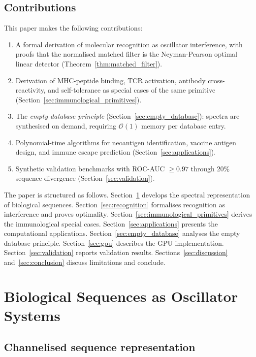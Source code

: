 \documentclass[twocolumn,11pt,a4paper]{article}
\theoremstyle{definition}
\theoremstyle{remark}
\begin{document}
\subsection{Contributions}

This paper makes the following contributions:
\begin{enumerate}
  \item A formal derivation of molecular recognition as oscillator interference,
    with proofs that the normalised matched filter is the Neyman-Pearson optimal
    linear detector (Theorem~\ref{thm:matched_filter}).
  \item Derivation of MHC-peptide binding, TCR activation, antibody
    cross-reactivity, and self-tolerance as special cases of the same primitive
    (Section~\ref{sec:immunological_primitives}).
  \item The \emph{empty database principle}
    (Section~\ref{sec:empty_database}): spectra are synthesised on demand,
    requiring $\mathcal{O}(1)$ memory per database entry.
  \item Polynomial-time algorithms for neoantigen identification, vaccine
    antigen design, and immune escape prediction
    (Section~\ref{sec:applications}).
  \item Synthetic validation benchmarks with ROC-AUC $\geq 0.97$ through 20\%
    sequence divergence (Section~\ref{sec:validation}).
\end{enumerate}

The paper is structured as follows. Section~\ref{sec:oscillator} develops the
spectral representation of biological sequences.
Section~\ref{sec:recognition} formalises recognition as interference and proves
optimality. Section~\ref{sec:immunological_primitives} derives the immunological
special cases. Section~\ref{sec:applications} presents the computational
applications. Section~\ref{sec:empty_database} analyses the empty database
principle. Section~\ref{sec:gpu} describes the GPU implementation.
Section~\ref{sec:validation} reports validation results.
Sections~\ref{sec:discussion} and~\ref{sec:conclusion} discuss limitations and
conclude.

\section{Biological Sequences as Oscillator Systems}
\label{sec:oscillator}

\subsection{Channelised sequence representation}
\label{sec:channelisation}
\end{document}
